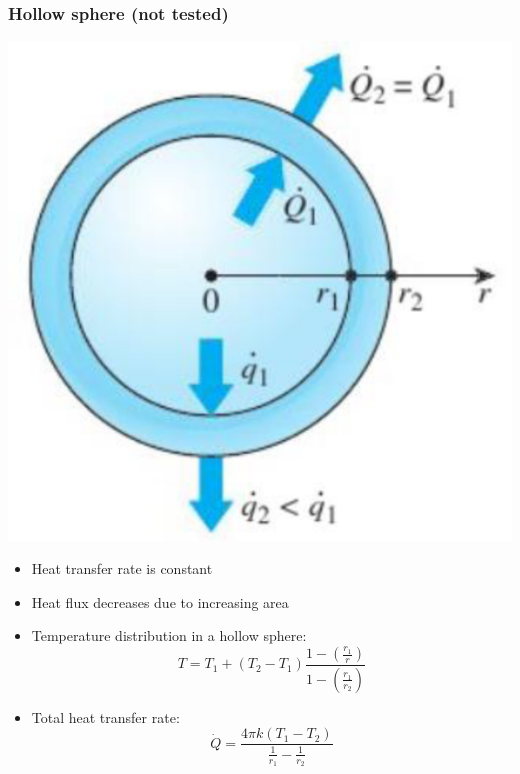 \documentclass[11pt]{article}
\begin{document}
\subsubsection{Hollow sphere (not tested)}
\label{sec:orgc01e971}
\begin{center}
\includegraphics[width=.9\linewidth]{./images/steady-state-heat-conduction-hollow-sphere.png}
\end{center}
\begin{itemize}
\item Heat transfer rate is constant
\item Heat flux decreases due to increasing area
\item Temperature distribution in a hollow sphere:
\[T = T_1 + (T_2 - T_1) \frac{1 - \left(\frac{r_1}{r} \right)}{1 - \left(\frac{r_1}{r_2} \right)}\]
\item Total heat transfer rate:
\[\dot{Q} = \frac{4 \pi k (T_1 - T_2)}{\frac{1}{r_1} - \frac{1}{r_2}}\]
\end{itemize}
\end{document}

